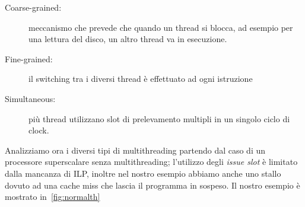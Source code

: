 \begin{description}
\item[Coarse-grained:] meccanismo che prevede che quando un thread si blocca, ad esempio per una lettura del disco, un altro thread va in esecuzione.
\item[Fine-grained:] il switching tra i diversi thread è effettuato ad ogni istruzione
\item[Simultaneous:] più thread utilizzano slot di prelevamento multipli in un singolo ciclo di clock.
\end{description}
Analizziamo ora i diversi tipi di multithreading partendo dal caso di un processore superscalare senza multithreading; l'utilizzo degli \emph{issue slot} è limitato dalla mancanza di ILP, inoltre nel nostro esempio abbiamo anche uno stallo dovuto ad una cache miss che lascia il programma in sospeso. Il nostro esempio è mostrato in \figurename\,\ref{fig:normalth}
